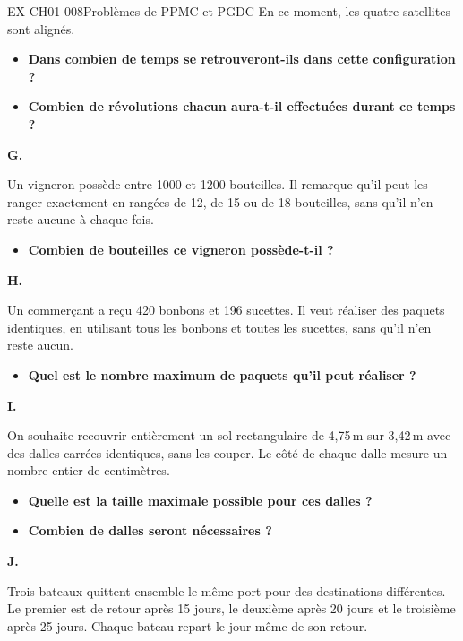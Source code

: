 \documentclass[12pt, a4paper]{article}
\begin{document}
\begin{exercice}{EX-CH01-008}{Problèmes de PPMC et PGDC}
En ce moment, les quatre satellites sont alignés.

\begin{itemize}[label=$\blacktriangleright$]
\item \textbf{Dans combien de temps se retrouveront-ils dans cette configuration ?}
\item \textbf{Combien de révolutions chacun aura-t-il effectuées durant ce temps ?}
\end{itemize}

\bigskip\textbf{G.}

Un vigneron possède entre 1000 et 1200 bouteilles. Il remarque qu'il peut les ranger exactement en rangées de 12, de 15 ou de 18 bouteilles, sans qu'il n'en reste aucune à chaque fois.

\begin{itemize}[label=$\blacktriangleright$]
    \item \textbf{Combien de bouteilles ce vigneron possède-t-il ?}
\end{itemize}

\bigskip\textbf{H.}

\medskip
Un commerçant a reçu 420 bonbons et 196 sucettes. Il veut réaliser des paquets identiques, en utilisant tous les bonbons et toutes les sucettes, sans qu'il n'en reste aucun.

\begin{itemize}[label=$\blacktriangleright$]
    \item \textbf{Quel est le nombre maximum de paquets qu'il peut réaliser ?}
\end{itemize}

\bigskip\textbf{I.}

\medskip
On souhaite recouvrir entièrement un sol rectangulaire de 4,75\,m sur 3,42\,m avec des dalles carrées identiques, sans les couper.
Le côté de chaque dalle mesure un nombre entier de centimètres.

\begin{itemize}[label=$\blacktriangleright$]
    \item \textbf{Quelle est la taille maximale possible pour ces dalles ?}
    \item \textbf{Combien de dalles seront nécessaires ?}
\end{itemize}

\bigskip\textbf{J.}

\medskip
Trois bateaux quittent ensemble le même port pour des destinations différentes. Le premier est de retour après 15 jours, le deuxième après 20 jours et le troisième après 25 jours. Chaque bateau repart le jour même de son retour.


\end{exercice}
\end{document}

